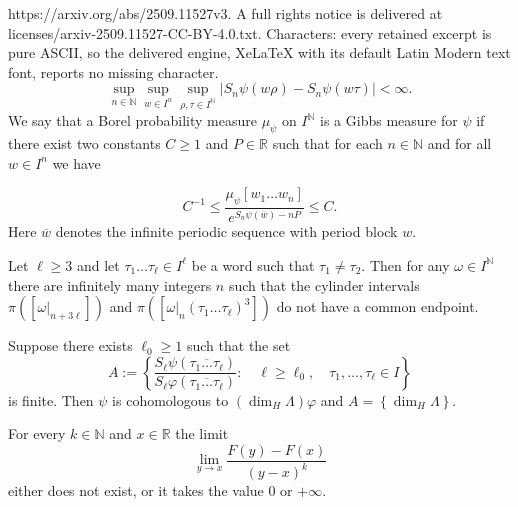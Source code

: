 \documentclass[10pt,a4paper]{amsart}
\newcommand\NN{\mathbb{N}}
\newcommand{\N}{\mathbb{N}}
\newcommand{\R}{\mathbb{R}}
\begin{document}
https://arxiv.org/abs/2509.11527v3. A full rights notice is delivered at licenses/arxiv-2509.11527-CC-BY-4.0.txt. Characters: every retained excerpt is pure ASCII, so the delivered engine, XeLaTeX with its default Latin Modern text font, reports no missing character.
\begin{equation}\label{eq:bdd}
\sup_{n\in \N} \sup_{w\in I^n} \sup_{\rho,\tau\in I^\N }\left|S_n \psi(w\rho)-S_n\psi(w\tau)\right|<\infty.
\end{equation} We say that a Borel probability measure $\mu_\psi$ on $I^{\N}$  is a Gibbs measure for $\psi$  if there exist two constants $C\ge 1$ and $P\in \R$ such that for each $n\in \N$ and for all $w \in I^n$ we have 

\begin{equation}\label{eq:gibbs}
C^{-1}\le \frac{\mu_\psi[w_1\dots w_n]}{e^{S_n\psi(\overline w)-nP }}\le C.
\end{equation} Here $\overline{w}$ denotes the infinite periodic sequence with period block $w$. 

\begin{lemma} \label{lem:non-adjacency}
Let {$\ell\geq 3$} and let $\tau_1\dots\tau_\ell\in I^\ell$ be a word such that $\tau_1\neq\tau_2$. Then for any $\omega\in I^\NN$ there are infinitely many integers $n$ such that the cylinder intervals $\pi([\omega|_{n+3\ell}])$ and $\pi([\omega|_{n}(\tau_1\dots\tau_\ell)^3])$ do not have a common endpoint.
\end{lemma}

\begin{lemma} \label{lem:cohom-1} 
Suppose there exists $\ell_0\ge 1$ such that the set
\[
A:=\left\{\frac{S_{\ell}\psi\left(\overline{\tau_{1}\dots \tau_{\ell}}\right)}{S_{\ell}\varphi\left(\overline{\tau_{1}\dots \tau_{\ell}}\right)}:\quad \ell \ge \ell_0,\quad \tau_1, \dots, \tau_\ell \in I \right\}
\]
is finite.
Then $\psi$ is cohomologous to $(\dim_{H}\Lambda)\varphi$  and $ A=\left\{\dim_{H}\Lambda\right\} $.
\end{lemma}

\begin{proposition} \label{prop:no-positive-derivative}
For every $k\in\mathbb{N}$ and $x\in\mathbb{R}$ the limit 
\[
\lim_{y\rightarrow x}\frac{F(y)-F(x)}{(y-x)^{k}}
\]
either does not exist, or it takes the value $0$ or $+\infty$. 
\end{proposition}
\end{document}
